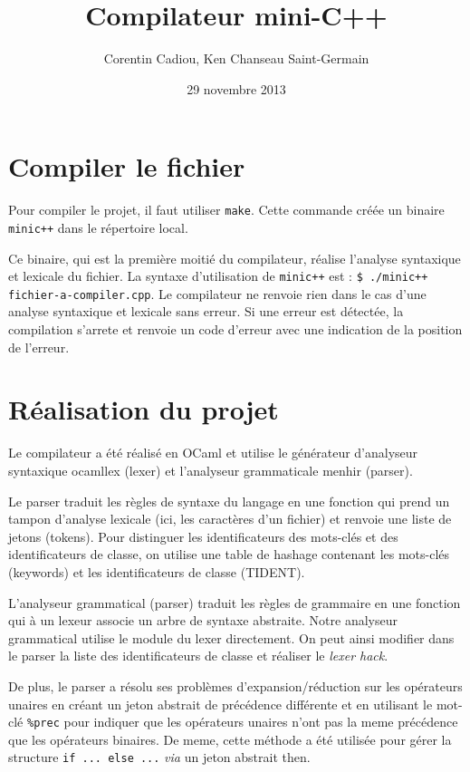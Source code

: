 \documentclass{article}
\title{Compilateur mini-C++}
\author{Corentin Cadiou, Ken Chanseau Saint-Germain}
\date{29 novembre 2013}
\begin{document}
\maketitle
\section*{Compiler le fichier}
Pour compiler le projet, il faut utiliser \texttt{make}. Cette
commande créée un binaire \texttt{minic++} dans le répertoire local.

Ce binaire, qui est la première moitié du compilateur, réalise
l'analyse syntaxique et lexicale du fichier. La syntaxe d'utilisation
de \texttt{minic++} est : \texttt{\$ ./minic++ fichier-a-compiler.cpp}. Le
compilateur ne renvoie rien dans le cas d'une analyse syntaxique et
lexicale sans erreur. Si une erreur est détectée, la compilation
s'arrete et renvoie un code d'erreur avec une indication de la
position de l'erreur.
\section*{Réalisation du projet}
Le compilateur a été réalisé en OCaml et utilise le générateur
d'analyseur syntaxique ocamllex (lexer) et l'analyseur grammaticale
menhir (parser).

Le parser traduit les règles de syntaxe du langage en une fonction
qui prend un tampon d'analyse lexicale (ici, les caractères d'un
fichier) et renvoie une liste de jetons (tokens). Pour distinguer les
identificateurs des mots-clés et des identificateurs de classe, on
utilise une table de hashage contenant les mots-clés (keywords) et les
identificateurs de classe (TIDENT).

L'analyseur grammatical (parser) traduit les règles de grammaire en
une fonction qui à un lexeur associe un arbre de syntaxe
abstraite. Notre analyseur grammatical utilise le module du lexer
directement. On peut ainsi modifier dans le parser la liste
des identificateurs de classe et réaliser le \emph{lexer hack}.

De plus, le parser a résolu ses problèmes d'expansion/réduction sur
les opérateurs unaires en créant un jeton abstrait de précédence
différente et en utilisant le mot-clé \texttt{\%prec} pour indiquer que les
opérateurs unaires n'ont pas la meme précédence que les opérateurs
binaires. De meme, cette méthode a été utilisée pour gérer la
structure \texttt{if ... else ...} \emph{via} un jeton abstrait then.
\end{document}
